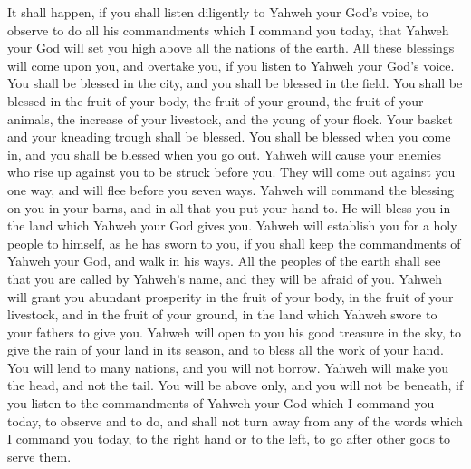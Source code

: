  It shall happen, if you shall listen diligently to Yahweh
your God's voice, to observe to do all his commandments which I command
you today, that Yahweh your God will set you high above all the nations
of the earth.  All these blessings will come upon you, and
overtake you, if you listen to Yahweh your God's voice. 
You shall be blessed in the city, and you shall be blessed in the field.
 You shall be blessed in the fruit of your body, the fruit
of your ground, the fruit of your animals, the increase of your
livestock, and the young of your flock.  Your basket and
your kneading trough shall be blessed.  You shall be
blessed when you come in, and you shall be blessed when you go out.
 Yahweh will cause your enemies who rise up against you to
be struck before you. They will come out against you one way, and will
flee before you seven ways.  Yahweh will command the
blessing on you in your barns, and in all that you put your hand to. He
will bless you in the land which Yahweh your God gives you.
 Yahweh will establish you for a holy people to himself,
as he has sworn to you, if you shall keep the commandments of Yahweh
your God, and walk in his ways.  All the peoples of the
earth shall see that you are called by Yahweh's name, and they will be
afraid of you.  Yahweh will grant you abundant prosperity
in the fruit of your body, in the fruit of your livestock, and in the
fruit of your ground, in the land which Yahweh swore to your fathers to
give you.  Yahweh will open to you his good treasure in
the sky, to give the rain of your land in its season, and to bless all
the work of your hand. You will lend to many nations, and you will not
borrow.  Yahweh will make you the head, and not the tail.
You will be above only, and you will not be beneath, if you listen to
the commandments of Yahweh your God which I command you today, to
observe and to do,  and shall not turn away from any of
the words which I command you today, to the right hand or to the left,
to go after other gods to serve them.

